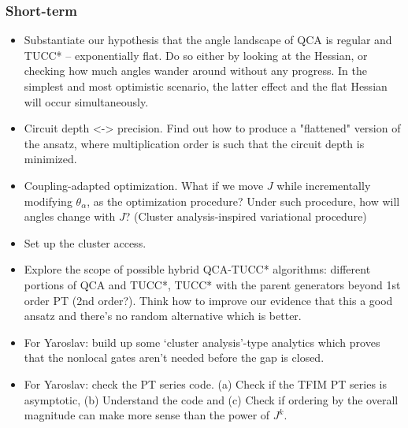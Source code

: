 \documentclass[10pt, a4paper]{article}
\begin{document}
\subsubsection*{Short-term}
\begin{itemize}

\item Substantiate our hypothesis that the angle landscape of QCA is regular and TUCC* -- exponentially flat. Do so either by looking at the Hessian, or checking how much angles wander around without any progress. In the simplest and most optimistic scenario, the latter effect and the flat Hessian will occur simultaneously.

\item Circuit depth <-> precision. Find out how to produce a "flattened" version of the ansatz, where multiplication order is such that the circuit depth is minimized. 

\item Coupling-adapted optimization. What if we move $J$ while incrementally modifying $\theta_{\alpha}$, as the optimization procedure? Under such procedure, how will angles change with $J$? (Cluster analysis-inspired variational procedure)

\item Set up the cluster access.

\item Explore the scope of possible hybrid QCA-TUCC* algorithms: different portions of QCA and TUCC*, TUCC* with the parent generators beyond 1st order PT (2nd order?). Think how to improve our evidence that this a good ansatz and there's no random alternative which is better.

\item For Yaroslav: build up some `cluster analysis'-type analytics which proves that the nonlocal gates aren't needed before the gap is closed.

\item For Yaroslav: check the PT series code. (a) Check if the TFIM PT series is asymptotic, (b) Understand the code and (c) Check if ordering by the overall magnitude can make more sense than the power of $J^k$.

\end{itemize}
\end{document}
